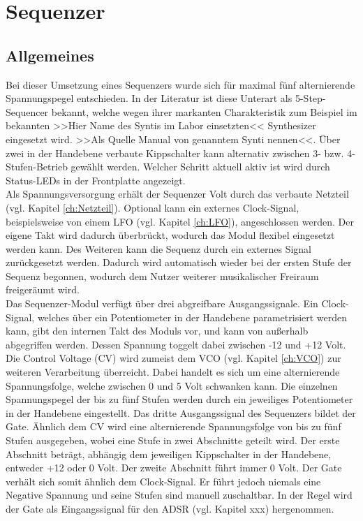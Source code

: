\chapter{Sequenzer}
\label{ch:Sequenzer}
\section{Allgemeines}
Bei dieser Umsetzung eines Sequenzers wurde sich für maximal fünf alternierende Spannungspegel entschieden. In der Literatur ist diese Unterart als 5-Step-Sequencer bekannt, welche wegen ihrer markanten Charakteristik zum Beispiel im bekannten >>Hier Name des Syntis im Labor einsetzten<< Synthesizer eingesetzt wird. >>Als Quelle Manual von genanntem Synti nennen<<. Über zwei in der Handebene verbaute Kippschalter kann alternativ zwischen 3- bzw. 4-Stufen-Betrieb gewählt werden. Welcher Schritt aktuell aktiv ist wird durch Status-LEDs in der Frontplatte angezeigt.\\
Als Spannungsversorgung erhält der Sequenzer  Volt durch das verbaute Netzteil (vgl. Kapitel \ref{ch:Netzteil}). Optional kann ein externes Clock-Signal, beispielsweise von einem LFO (vgl. Kapitel \ref{ch:LFO}), angeschlossen werden. Der eigene Takt wird dadurch überbrückt, wodurch das Modul flexibel eingesetzt werden kann. Des Weiteren kann die Sequenz durch ein externes Signal zurückgesetzt werden. Dadurch wird automatisch wieder bei der ersten Stufe der Sequenz begonnen, wodurch dem Nutzer weiterer musikalischer Freiraum freigeräumt wird.\\
Das Sequenzer-Modul verfügt über drei abgreifbare Ausgangssignale. Ein Clock-Signal, welches über ein Potentiometer in der Handebene parametrisiert werden kann, gibt den internen Takt des Moduls vor, und kann von außerhalb abgegriffen werden. Dessen Spannung toggelt dabei zwischen -12 und +12 Volt. Die Control Voltage (CV) wird zumeist dem VCO (vgl. Kapitel \ref{ch:VCO}) zur weiteren Verarbeitung überreicht. Dabei handelt es sich um eine alternierende Spannungsfolge, welche zwischen 0 und 5 Volt schwanken kann. Die einzelnen Spannungspegel der bis zu fünf Stufen werden durch ein jeweiliges Potentiometer in der Handebene eingestellt. Das dritte Ausgangssignal des Sequenzers bildet der Gate. Ähnlich dem CV wird eine alternierende Spannungsfolge von bis zu fünf Stufen ausgegeben, wobei eine Stufe in zwei Abschnitte geteilt wird. Der erste Abschnitt beträgt, abhängig dem jeweiligen Kippschalter in der Handebene, entweder +12 oder 0 Volt. Der zweite Abschnitt führt immer 0 Volt. Der Gate verhält sich somit ähnlich dem Clock-Signal. Er führt jedoch niemals eine Negative Spannung und seine Stufen sind manuell zuschaltbar. In der Regel wird der Gate als Eingangssignal für den ADSR (vgl. Kapitel xxx) hergenommen.

